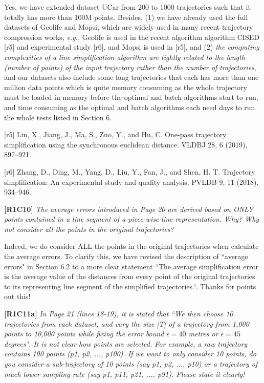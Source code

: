 \documentclass{letter}
\newcommand{\eg}{\emph{e.g.,}\xspace}
\begin{document}
{Yes, we have extended dataset UCar from 200 to 1000 trajectories such that it totally has more than {100M} points. Besides, (1) we have already used the full datasets of Geolife and Mopsi, which are widely used in many recent trajectory compression works, \eg Geolife is used in the recent algorithm algorithm CISED [r5] and experimental study [r6], and Mopsi is used in [r5], and (2) \emph{the computing complexities of a line simplification algorithm are tightly related to the length (number of points) of the input trajectory rather than the number of trajectories}, and our datasets also include some long trajectories that each has more than {one million} data points which is quite memory consuming as the whole trajectory must be loaded in memory before the optimal and batch algorithms start to run, and time consuming as the optimal and batch algorithms each need {days} to run the whole tests listed in Section 6. %

[r5] Lin, X., Jiang, J., Ma, S., Zuo, Y., and Hu, C. One-pass trajectory simplification using the synchronous euclidean distance. VLDBJ 28, 6 (2019), 897–921.

[r6] Zhang, D., Ding, M., Yang, D., Liu, Y., Fan, J., and Shen, H. T. Trajectory simplification: An experimental study and quality analysis. PVLDB 9, 11 (2018), 934–946.

\textbf{[R1C10]} \emph{The average errors introduced in Page 20 are derived based on ONLY points contained in a line segment of a piece-wise line representation. Why? Why not consider all the points in the original trajectories? }

Indeed, we do consider ALL the points in the original trajectories when calculate the average errors. To clarify this, we have revised the description of ``average errors" in Section 6.2 to a more clear statement ``{The average simplification error is the average value of the distances from every point of the original trajectories to its representing line segment of the simplified trajectories.}``. Thanks for points out this!


\textbf{[R1C11a]} \emph{ In Page 21 (lines 18-19), it is stated that ``We then choose 10 trajectories from each dataset, and vary the size |T| of a trajectory from 1,000 points to 10,000 points while fixing the error bound $\epsilon = 40$ metres or $\epsilon = 45$ degrees". It is not clear how points are selected. For example, a raw trajectory contains 100 points (p1, p2, ..., p100). If we want to only consider 10 points, do you consider a sub-trajectory of 10 points (say p1, p2, ..., p10) or a trajectory of much lower sampling rate (say p1, p11, p21, ..., p91). Please state it clearly!}

}
\end{document}
